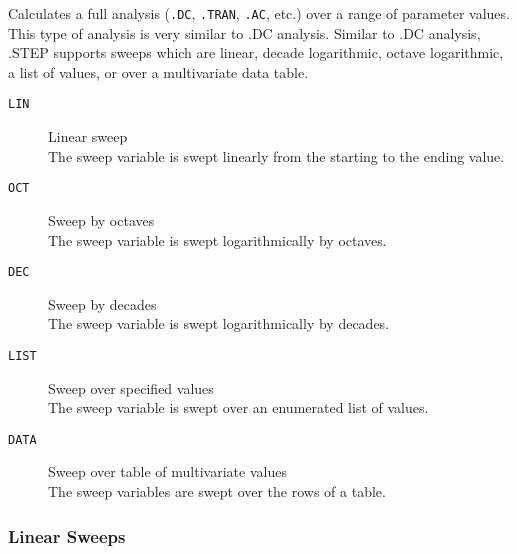 


 
Calculates a full analysis (\verb|.DC|, \verb|.TRAN|, \verb|.AC|, etc.) over a range of
parameter values.  This type of analysis is very similar to .DC analysis.
Similar to .DC analysis, .STEP supports sweeps which are
linear, decade logarithmic, octave logarithmic, a list of values, or over a multivariate data table.

\begin{description}

\item[\tt LIN] Linear sweep \\
The sweep variable is swept linearly from the starting to the ending value.

\item[\tt OCT] Sweep by octaves \\
The sweep variable is swept logarithmically by octaves.

\item[\tt DEC] Sweep by decades \\
The sweep variable is swept logarithmically by decades.

\item[\tt LIST] Sweep over specified values \\
The sweep variable is swept over an enumerated list of values.

\item[\tt DATA] Sweep over table of multivariate values\\
The sweep variables are swept over the rows of a table.  

\end{description}

\subsubsection{Linear Sweeps}
 

